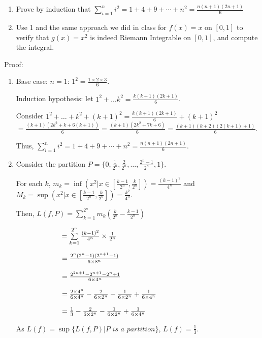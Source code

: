\documentclass{article}
\begin{document}
\begin{enumerate}
\item Prove by induction that $\sum\limits_{i=1}^ni^2=1+4+9+\cdots+n^2=\frac{n(n+1)(2n+1)}{6}$
\item Use 1 and the same approach we did in class for $f(x)=x$ on $[0,1]$ to verify that $g(x)=x^2$ is indeed Riemann Integrable on $[0,1]$, and compute the integral.
\end{enumerate}

Proof:
\begin{enumerate}
    \item Base case: $n = 1$: $1^2 = \frac{1\times 2\times 3}{6}$.

    Induction hypothesis: let $1^2 + \dots k^2 = \frac{k(k+1)(2k+1)}{6}$.

    Consider $1^2 + \dots + k^2 + (k+1)^2 = \frac{k(k+1)(2k+1)}{6} + (k+1)^2$\\$ = \frac{(k+1)(2k^2+k + 6(k+1))}{6} = \frac{(k+1)(2k^2 + 7k + 6)}{6} = \frac{(k+1)(k+2)(2(k+1)+1)}{6}$.

    Thus, $\sum\limits_{i=1}^ni^2=1+4+9+\cdots+n^2=\frac{n(n+1)(2n+1)}{6}$.

    \item Consider the partition $ P = \{0, \frac{1}{2^n}, \frac{2}{2^n}, \dots , \frac{2^n-1}{2^n}, 1\}$.

    For each $k$, $m_k = \inf(x^2|x \in [\frac{k-1}{2^n}, \frac{k}{2^n}]) = \frac{(k-1)^2}{4^n}$ and $M_k = \sup(x^2|x \in [\frac{k-1}{2^n}, \frac{k}{2^n}]) = \frac{k^2}{4^n}$.

    Then, $L(f, P) = \sum\limits_{k=1}^{2^n} m_k(\frac{k}{2^n} - \frac{k-1}{2^n}) $

    $\hspace{2.25cm}= \sum\limits_{k=1}^{2^n} \frac{(k-1)^2}{4^n} \times \frac{1}{2^n}$

    $\hspace{2.25cm}= \frac{2^n(2^n-1)(2^{n+1}-1)}{6\times8^n}$

    $ \hspace{2.25cm}= \frac{2^{2n+1} -2^{n+1} - 2^n +1}{6\times4^n} $

    $\hspace{2.25cm}= \frac{2\times4^n}{6\times4^n} - \frac{2}{6\times2^n} - \frac{1}{6\times2^n} + \frac{1}{6\times 4^n} $

    $\hspace{2.25cm}= \frac{1}{3} - \frac{2}{6\times2^n} - \frac{1}{6\times2^n} + \frac{1}{6\times 4^n}$

    As $L(f) = \sup\{ L(f, P) | P \textit{ is a partition}\}$, $L(f) = \frac{1}{3}$.


\end{enumerate}
\end{document}
